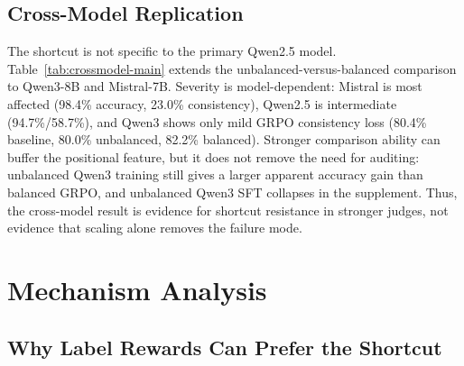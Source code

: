 \documentclass[letterpaper]{article}
\begin{document}
\subsection{Cross-Model Replication}

The shortcut is not specific to the primary Qwen2.5 model. Table~\ref{tab:crossmodel-main} extends the unbalanced-versus-balanced comparison to Qwen3-8B and Mistral-7B. Severity is model-dependent: Mistral is most affected (98.4\% accuracy, 23.0\% consistency), Qwen2.5 is intermediate (94.7\%/58.7\%), and Qwen3 shows only mild GRPO consistency loss (80.4\% baseline, 80.0\% unbalanced, 82.2\% balanced). Stronger comparison ability can buffer the positional feature, but it does not remove the need for auditing: unbalanced Qwen3 training still gives a larger apparent accuracy gain than balanced GRPO, and unbalanced Qwen3 SFT collapses in the supplement. Thus, the cross-model result is evidence for shortcut resistance in stronger judges, not evidence that scaling alone removes the failure mode.

\begin{table}[t]
\centering
\scriptsize
\setlength{\tabcolsep}{2.5pt}
\caption{Cross-model GRPO replication. Shortcut severity is largest on Mistral and mildest on Qwen3.}
\label{tab:crossmodel-main}
\end{table}

\section{Mechanism Analysis}

\subsection{Why Label Rewards Can Prefer the Shortcut}
\end{document}
